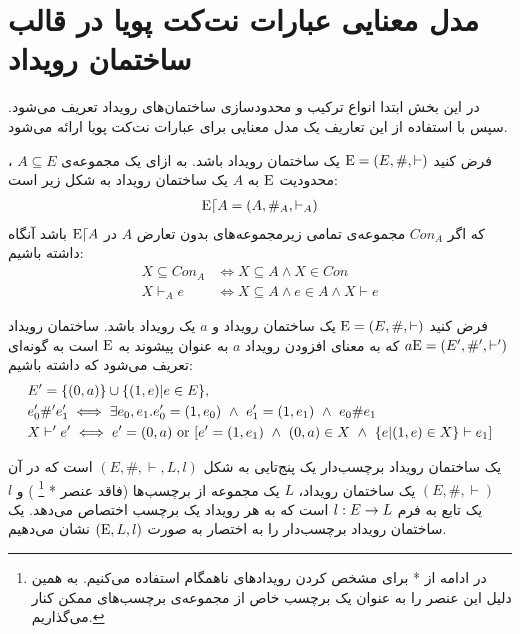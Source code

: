 \section{مدل معنایی عبارات نت‌کت پویا در قالب ساختمان رویداد}
در این بخش ابتدا انواع ترکیب و محدود‌سازی ساختمان‌‌های رویداد تعریف می‌شود.
سپس با استفاده از این تعاریف  یک مدل معنایی برای عبارات نت‌کت پویا ارائه می‌شود.

\begin{definition}
    فرض کنید
    $\mathrm{E} = (E,\#,\vdash)$
    یک ساختمان رویداد باشد.
    به ازای یک مجموعه‌ی
    $A \subseteq E$
    ،
    محدودیت%
    $\mathrm{E}$
    به
    $A$
    یک ساختمان رویداد به شکل زیر است:
    \begin{align*}
        \mathrm{E} \lceil A = (A,\#_A,\vdash_A)
    \end{align*}
    که اگر
    $Con_A$
    مجموعه‌ی تمامی زیرمجموعه‌های بدون تعارض
    $A$
    در
    $\mathrm{E}\lceil A$
    باشد آنگاه داشته باشیم:
    \begin{align*}
        X \subseteq Con_A & \iff X \subseteq A \wedge X \in Con                 \\
        X \vdash_A e      & \iff X \subseteq A \wedge e \in A \wedge X \vdash e
    \end{align*}
\end{definition}

\begin{definition}
    فرض کنید
    $\mathrm{E} = (E,\#,\vdash)$
    یک ساختمان رویداد و
    $a$
    یک رویداد باشد.
    ساختمان رویداد
    $a\mathrm{E} = (E',\#',\vdash')$
    که به معنای افزودن رویداد
    $a$
    به عنوان پیشوند
    به
    $\mathrm{E}$
    است
    به گونه‌ای تعریف می‌شود که داشته باشیم:
    \begin{align*}
         & E' = \s{(0,a)} \cup \s{(1,e)|e \in E},                                                                               \\
         & e_0' \#' e_1'  \iff \exists e_0,e_1.e_0' = (1,e_0)
        \ \wedge \ e_1' = (1,e_1) \ \wedge \ e_0 \# e_1                                                                         \\
         & X \vdash' e' \iff e' = (0,a) \text{ or } [e' = (1,e_1) \ \wedge \ (0,a)\in X \ \wedge \ \s{e|(1,e)\in X} \vdash e_1]
    \end{align*}
\end{definition}

\begin{definition}
    یک ساختمان رویداد برچسب‌دار%
    یک پنج‌تایی به شکل
    $(E,\#,\vdash,L,l)$
    است که در آن
    $(E,\#,\vdash)$
    یک ساختمان رویداد،
    $L$
    یک مجموعه از برچسب‌ها
    (فاقد عنصر *
    \footnote{
        در ادامه از * برای مشخص کردن رویداد‌های ناهمگام استفاده می‌کنیم. به همین دلیل این عنصر را به عنوان یک برچسب خاص از مجموعه‌ی برچسب‌های ممکن کنار می‌گذاریم.
    }
    )
    و
    $l$
    یک تابع به فرم
    $l: E \rightarrow L$
    است که به هر رویداد یک برچسب اختصاص می‌دهد.
    یک ساختمان رویداد برچسب‌دار را به اختصار به صورت
    $(\mathrm{E},L,l)$
    نشان می‌دهیم.
\end{definition}

